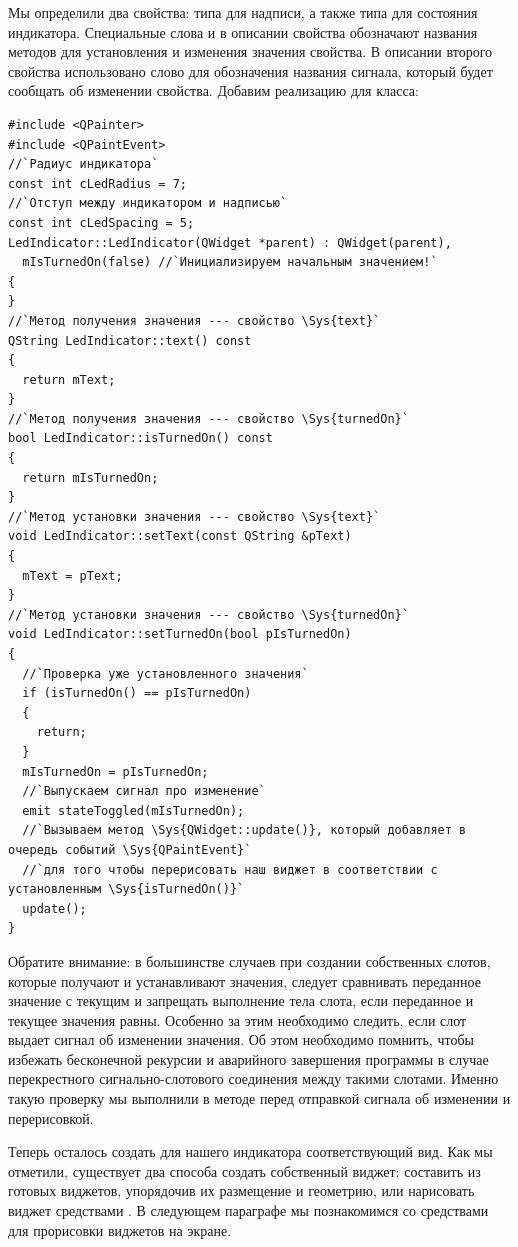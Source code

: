 Мы определили два свойства:  типа  для надписи, а также
 типа  для состояния индикатора. Специальные слова  и
 в описании свойства обозначают названия методов для установления и изменения значения свойства. В
описании второго свойства использовано слово  для обозначения названия сигнала, который будет
сообщать об изменении свойства. Добавим реализацию для класса:
\begin{lstlisting}
#include <QPainter>
#include <QPaintEvent>
//`Радиус индикатора`
const int cLedRadius = 7;
//`Отступ между индикатором и надписью`
const int cLedSpacing = 5;
LedIndicator::LedIndicator(QWidget *parent) : QWidget(parent),
  mIsTurnedOn(false) //`Инициализируем начальным значением!`
{
}
//`Метод получения значения --- свойство \Sys{text}`
QString LedIndicator::text() const
{
  return mText;
}
//`Метод получения значения --- свойство \Sys{turnedOn}`
bool LedIndicator::isTurnedOn() const
{
  return mIsTurnedOn;
}
//`Метод установки значения --- свойство \Sys{text}`
void LedIndicator::setText(const QString &pText)
{
  mText = pText;
}
//`Метод установки значения --- свойство \Sys{turnedOn}`
void LedIndicator::setTurnedOn(bool pIsTurnedOn)
{
  //`Проверка уже установленного значения`
  if (isTurnedOn() == pIsTurnedOn)
  {
    return;
  }
  mIsTurnedOn = pIsTurnedOn;
  //`Выпускаем сигнал про изменение`
  emit stateToggled(mIsTurnedOn);
  //`Вызываем метод \Sys{QWidget::update()}, который добавляет в очередь событий \Sys{QPaintEvent}`
  //`для того чтобы перерисовать наш виджет в соответствии с установленным \Sys{isTurnedOn()}`
  update();
}
\end{lstlisting}


Обратите внимание: в большинстве случаев при создании собственных слотов, которые получают и
устанавливают значения, следует сравнивать переданное значение с текущим и запрещать выполнение тела слота, если
переданное и текущее значения равны. Особенно за этим необходимо следить, если слот выдает сигнал об изменении
значения. Об этом необходимо помнить, чтобы избежать бесконечной рекурсии и аварийного завершения программы в случае
перекрестного сигнально-слотового соединения между такими слотами. Именно такую проверку мы выполнили в методе
 перед отправкой сигнала об изменении и перерисовкой.

Теперь осталось создать для нашего индикатора соответствующий вид. Как мы отметили, существует два способа создать
собственный виджет: составить из готовых виджетов, упорядочив их размещение и геометрию, или нарисовать виджет
средствами . В следующем параграфе мы познакомимся со средствами для прорисовки виджетов на экране.

